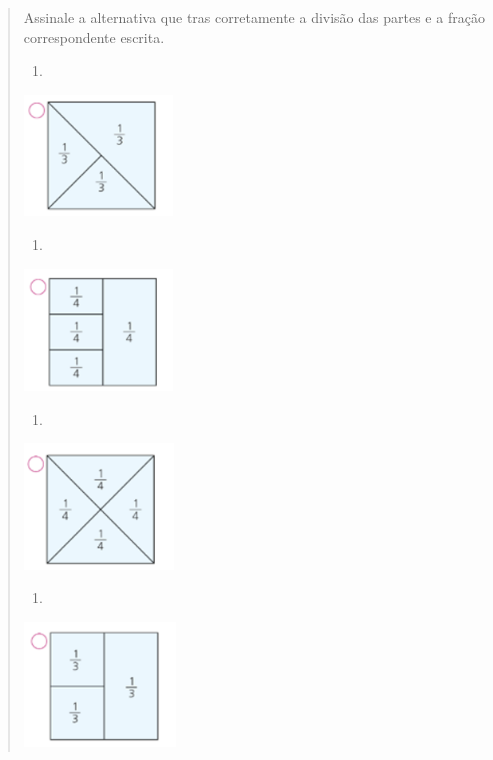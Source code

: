 \begin{enumerate}
\begin{escolha}
\begin{enumerate}
\begin{itemize}
\begin{itemize}
\begin{escolha}
\begin{quote}
\begin{escolha}
{Assinale a alternativa que tras corretamente a divisão das partes e a
fração correspondente escrita.

\begin{enumerate}
\def\labelenumi{\alph{enumi})}
\item
\end{enumerate}

\includegraphics[width=1.55847in,height=1.26678in]{media/image123.png}

\begin{enumerate}
\def\labelenumi{\alph{enumi})}
\item
\end{enumerate}

\includegraphics[width=1.55847in,height=1.27511in]{media/image124.png}

\begin{enumerate}
\def\labelenumi{\alph{enumi})}
\item
\end{enumerate}

\includegraphics[width=1.56680in,height=1.31678in]{media/image125.png}

\begin{enumerate}
\def\labelenumi{\alph{enumi})}
\item
\end{enumerate}

\includegraphics[width=1.58347in,height=1.30845in]{media/image126.png}

}
\end{escolha}
\end{quote}
\end{escolha}
\end{itemize}
\end{itemize}
\end{enumerate}
\end{escolha}
\end{enumerate}
